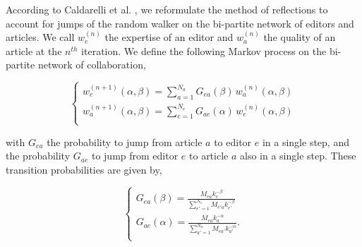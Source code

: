 According to  Caldarelli et al. \cite{caldarelli2012network}, we reformulate the method of reflections to account for jumps of the random walker on the bi-partite network of editors and articles. We call $w^{(n)}_e$ the expertise of an editor and $w^{(n)}_a$ the quality of an article at the $n^{th}$ iteration. We define the following Markov process on the bi-partite network of collaboration, 

\begin{equation}
\begin{cases}
w^{(n+1)}_e (\alpha,\beta) = \sum_{a=1}^{N_a}  G_{ea}(\beta) \,w^{(n)}_a (\alpha,\beta)\\[7pt]
w^{(n+1)}_a (\alpha,\beta) = \sum_{e=1}^{N_e}  G_{ae}(\alpha) \, w^{(n)}_e (\alpha,\beta)\\
\end{cases}
\label{random_walker}
\end{equation}

with $G_{ea}$ the probability  to jump from article $a$ to editor $e$ in a single step, and the probability $G_{ae}$ to jump from editor $e$ to article $a$ also in a single step. These transition probabilities are given by,

\begin{equation}
\begin{cases}
G_{ea}(\beta) = \frac{M_{ea} k_{e}^{-\beta}}{\sum_{e' = 1}^{N_e} M_{e'a} k_{e'}^{-\beta}}\\[10pt]
G_{ae}(\alpha) = \frac{M_{ea} k_{a}^{-\alpha}}{\sum_{a' = 1}^{N_a} M_{ea'} k_{a'}^{-\alpha}}.\\
 \end{cases}
\end{equation}

